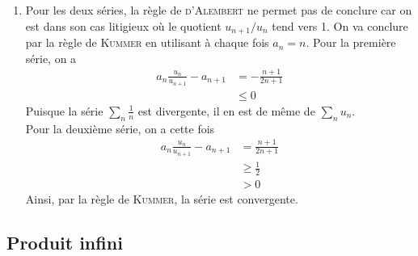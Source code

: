 \begin{enumerate}
    \item Pour les deux séries, la règle de \textsc{d'Alembert} ne permet pas de conclure car on est dans son cas litigieux où le quotient
$u_{n+1}/u_n$ tend vers 1. On va conclure par la règle de \textsc{Kummer} en utilisant à chaque fois $a_n=n$. Pour la première série, on a 
        \[
            \begin{aligned}
                a_n\frac{u_n}{u_{n+1}}-a_{n+1}&=-\frac{n+1}{2n+1}\\
                &\leq 0
            \end{aligned}
        \]	
        Puisque la série $\sum\limits_n \frac{1}{n}$ est divergente, il en est de même de $\sum\limits_n u_n$.\\
Pour la deuxième série, on a cette fois 
        \[
            \begin{aligned}
                a_n\frac{u_n}{u_{n+1}}-a_{n+1}&=\frac{n+1}{2n+1}\\
                &\geqslant\frac{1}{2}\\
                &>0
            \end{aligned}
        \]
Ainsi, par la règle de \textsc{Kummer}, la série est convergente.
\end{enumerate}


\subsection{Produit infini}

